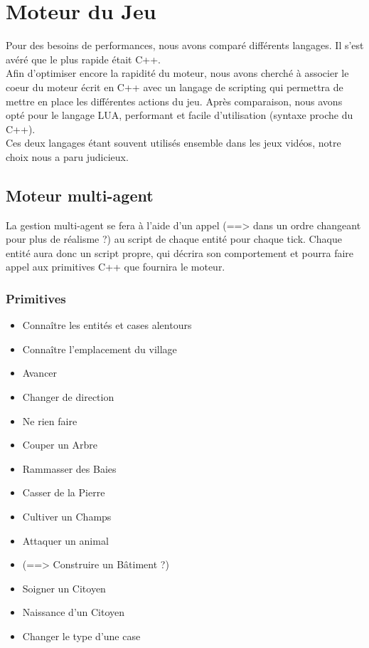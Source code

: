 \documentclass[a4paper]{article}
\begin{document}


    \section{Moteur du Jeu}
      Pour des besoins de performances, nous avons comparé différents langages. Il s'est avéré que le plus rapide était C++.\\
      Afin d'optimiser encore la rapidité du moteur, nous avons cherché à associer le coeur du moteur écrit en C++ avec un langage de scripting qui permettra de mettre en place les différentes actions du jeu. Après comparaison, nous avons opté pour le langage LUA, performant et facile d'utilisation (syntaxe proche du C++).\\
      Ces deux langages étant souvent utilisés ensemble dans les jeux vidéos, notre choix nous a paru judicieux.

      \subsection{Moteur multi-agent}
        La gestion multi-agent se fera à l'aide d'un appel (==> dans un ordre changeant pour plus de réalisme ?) au script de chaque entité pour chaque tick. Chaque entité aura donc un script propre, qui décrira son comportement et pourra faire appel aux primitives C++ que fournira le moteur.

        \subsubsection{Primitives}
          \begin{itemize} \small
            \item Connaître les entités et cases alentours
            \item Connaître l'emplacement du village
            \item Avancer
            \item Changer de direction
            \item Ne rien faire
            \item Couper un Arbre
            \item Rammasser des Baies
            \item Casser de la Pierre
            \item Cultiver un Champs
            \item Attaquer un animal
            \item (==> Construire un Bâtiment ?)
            \item Soigner un Citoyen
            \item Naissance d'un Citoyen
            \item Changer le type d'une case
          \end{itemize} \normalsize
\end{document}
